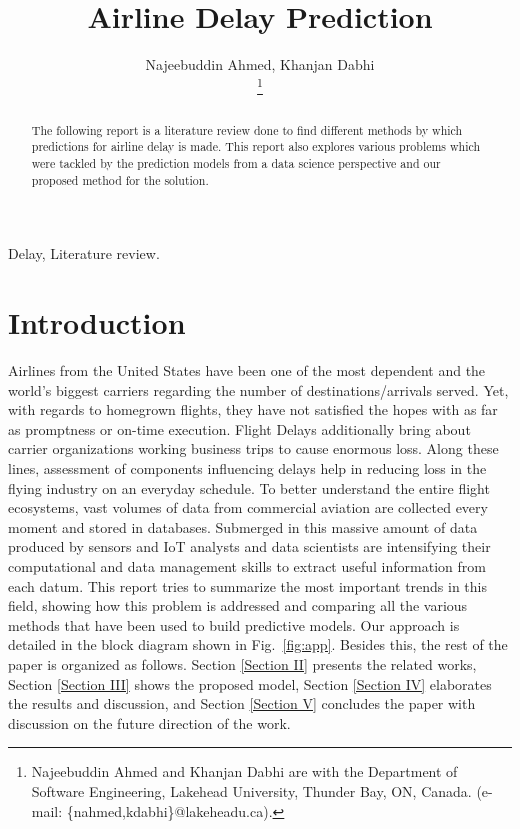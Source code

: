 \documentclass[conference]{IEEEtran}
\begin{document}
\title {Airline Delay Prediction}




\author{{Najeebuddin Ahmed, Khanjan Dabhi}


\thanks{Najeebuddin Ahmed and Khanjan Dabhi are with the Department of Software Engineering, Lakehead University, Thunder Bay, ON, Canada. (e-mail: \{nahmed,kdabhi\}@lakeheadu.ca).}

}

\maketitle

\begin{abstract}
The following report is a literature review done
to find different methods by which predictions for airline
delay is made. This report also explores various problems
which were tackled by the prediction models from a data
science perspective and our proposed method for the
solution. 
\end{abstract}

\begin{IEEEkeywords}
Delay, Literature review.
\end{IEEEkeywords}


\section{Introduction}
Airlines from the United States have been one of the most dependent and the world's biggest carriers regarding the number of destinations/arrivals served. Yet, with regards to homegrown flights, they have not satisfied the hopes with as far as promptness or on-time execution. Flight Delays additionally bring about carrier organizations working business trips to cause enormous loss. Along these lines, assessment of components influencing delays help in reducing loss in the flying industry on an everyday schedule. 
To better understand the entire flight ecosystems, vast volumes of data from commercial aviation are collected every moment and stored in databases. Submerged in this massive amount of data produced by sensors and IoT analysts and data scientists are intensifying their computational and data management skills to extract useful information from each datum. This report tries to summarize the most important trends in this field, showing how this problem is addressed and comparing all the various methods that have been used to build predictive models. Our approach is detailed in the block diagram shown in Fig.~\ref{fig:app}. Besides this, the rest of the paper is organized as follows. Section \ref{Section II} presents the related works, Section \ref{Section III} shows the proposed model, Section \ref{Section IV} elaborates the results and discussion, and Section \ref{Section V} concludes the paper with discussion on the future direction of the work.
\end{document}
